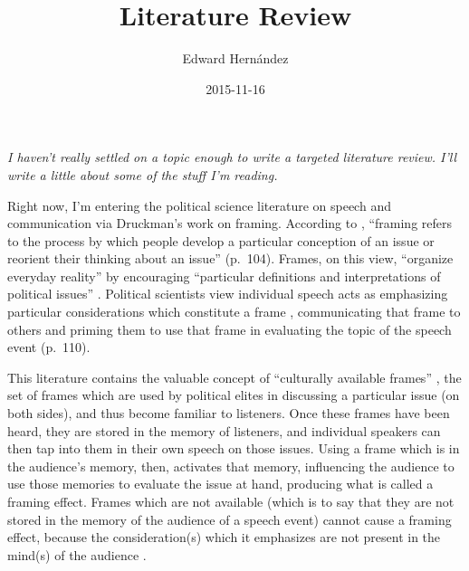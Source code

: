 \documentclass[doc,12pt]{apa6}
\begin{document}
\title{Literature Review}
\author{Edward Hern\'{a}ndez}
\date{2015-11-16}
\maketitle

\noindent
\emph{
I haven't really settled on a topic enough to write a targeted literature
review. I'll write a little about some of the stuff I'm reading.
}

\vspace{12pt}

Right now, I'm entering the political science literature on speech and
communication via Druckman's work on framing. According to ,
``framing refers to the process by which people develop a particular conception
of an issue or reorient their thinking about an issue'' (p.~104). Frames, on
this view, ``organize everyday reality'' \cite[p.~193]{Tuchman78} by
encouraging ``particular definitions and interpretations of political issues''
\cite[p.~343]{Shah02}. Political scientists view individual speech acts as
emphasizing particular considerations which constitute a frame
\cite[p~106]{Chong07}, communicating that frame to others and priming them to
use that frame in evaluating the topic of the speech event (p.~110).

This literature contains the valuable concept of ``culturally available
frames'' \cite[p.~144]{Gamson87}, the set of frames which are used by political
elites in discussing a particular issue (on both sides), and thus become
familiar to listeners. Once these frames have been heard, they are stored in
the memory of listeners, and individual speakers can then tap into them in
their own speech on those issues.
%
%
Using a frame which is in the audience's memory, then, activates that memory,
influencing the audience to use those memories to evaluate the issue at hand,
producing what is called a framing effect. Frames which are not available
(which is to say that they are not stored in the memory of the audience of a
speech event) cannot cause a framing effect, because the consideration(s) which
it emphasizes are not present in the mind(s) of the audience
\cite[p.~110]{Chong07}.
\end{document}
